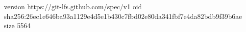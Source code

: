 version https://git-lfs.github.com/spec/v1
oid sha256:26ec1e646ba93a1129e4d5e1b430c7fbd02e80da341fbf7e4da82bdb9f39b6ae
size 5564
